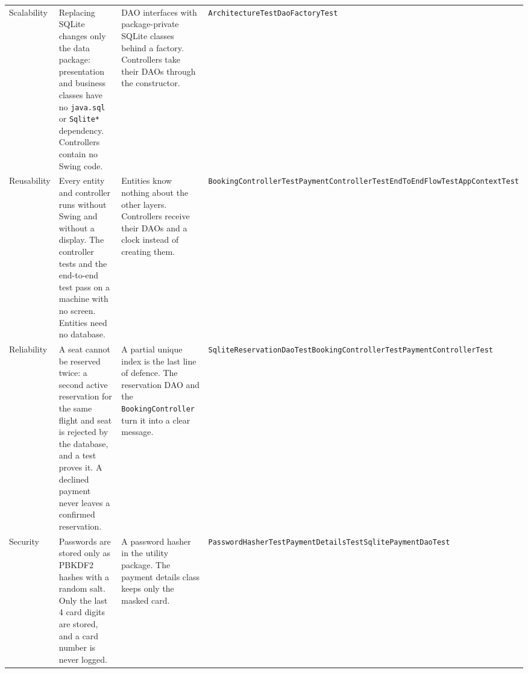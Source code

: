 \begin{longtable}{@{}>{\raggedright\arraybackslash}p{2.8cm}>{\raggedright\arraybackslash}p{4.1cm}>{\raggedright\arraybackslash}p{3.5cm}>{\raggedright\arraybackslash}p{4.0cm}@{}}
Scalability & Replacing SQLite changes only the data package: presentation and business classes have no \texttt{java.sql} or \texttt{Sqlite*} dependency. Controllers contain no Swing code. & DAO interfaces with package-private SQLite classes behind a factory. Controllers take their DAOs through the constructor. & \footnotesize \texttt{ArchitectureTest}\newline \texttt{DaoFactoryTest}\\
Reusability & Every entity and controller runs without Swing and without a display. The controller tests and the end-to-end test pass on a machine with no screen. Entities need no database. & Entities know nothing about the other layers. Controllers receive their DAOs and a clock instead of creating them. & \footnotesize \texttt{BookingControllerTest}\newline \texttt{PaymentControllerTest}\newline \texttt{EndToEndFlowTest}\newline \texttt{AppContextTest}\\
Reliability & A seat cannot be reserved twice: a second active reservation for the same flight and seat is rejected by the database, and a test proves it. A declined payment never leaves a confirmed reservation. & A partial unique index is the last line of defence. The reservation DAO and the \texttt{BookingController} turn it into a clear message. & \footnotesize \texttt{SqliteReservationDaoTest}\newline \texttt{BookingControllerTest}\newline \texttt{PaymentControllerTest}\\
Security & Passwords are stored only as PBKDF2 hashes with a random salt. Only the last 4 card digits are stored, and a card number is never logged. & A password hasher in the utility package. The payment details class keeps only the masked card. & \footnotesize \texttt{PasswordHasherTest}\newline \texttt{PaymentDetailsTest}\newline \texttt{SqlitePaymentDaoTest}\\
\bottomrule
\end{longtable}
\endgroup
